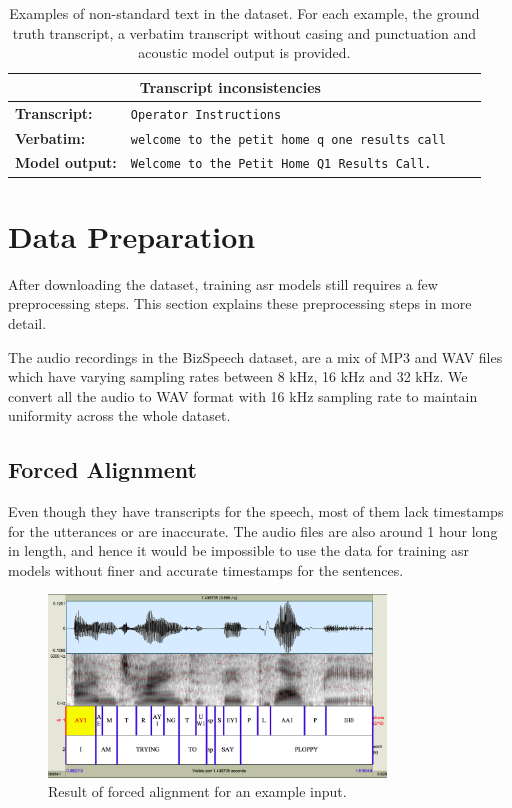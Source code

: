 \begin{table}[ht]
\begin{tabular}{ l p{9.6cm} c c }
 \multicolumn{2}{c}{\textbf{Transcript inconsistencies}} \\
 \hline
 \textbf{Transcript:} & \verb|Operator Instructions| \\ 
 \textbf{Verbatim:} & \verb|welcome to the petit home q one results call| \\
 \textbf{Model output:} & \verb|Welcome to the Petit Home Q1 Results Call.|\\
 \hline\hline
\end{tabular}
\caption{\label{table:examples}Examples of non-standard text in the dataset. For each example, the ground truth transcript, a verbatim transcript without casing and punctuation and acoustic model output is provided.}
\end{table}


\section{Data Preparation}
\label{section:dataprep}
After downloading the dataset, training \acrshort{asr} models still requires a few preprocessing steps. This section explains these preprocessing steps in more detail. 

The audio recordings in the BizSpeech dataset, are a mix of MP3 and WAV files which have varying sampling rates between 8 kHz, 16 kHz and 32 kHz. We convert all the audio to WAV format with 16 kHz sampling rate to maintain uniformity across the whole dataset.

\subsection{Forced Alignment}
Even though they have transcripts for the speech, most of them lack timestamps for the utterances or are inaccurate. The audio files are also around 1 hour long in length, and hence it would be impossible to use the data for training \acrshort{asr} models without finer and accurate timestamps for the sentences. 

\begin{figure}[ht]
  \begin{center}
    \includegraphics[width=0.8\textwidth]{images/ploppy.png} 
    \caption{Result of forced alignment for an example input. \cite{Yuan2008SPEAKERCORPUS}}
    \label{fig:p2fa}
  \end{center}
\end{figure}

